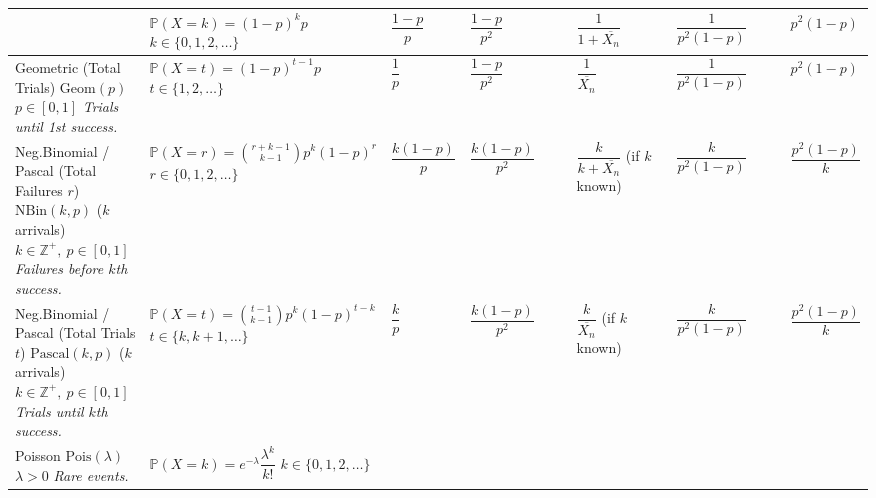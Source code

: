 \documentclass[8pt,a4paper]{extarticle}
\newcommand{\Pp}{\mathbb{P}}
\newcommand{\1}{\mathds{1}}
\begin{document}
\begin{table}[htpb]
{\begin{tabular}{@{}m{0.16\linewidth}m{0.26\linewidth}m{0.08\linewidth}m{0.14\linewidth}m{0.14\linewidth}m{0.15\linewidth}m{0.12\linewidth}@{}}
    & $\Pp(X=k)=(1-p)^k p$ \newline $k\in\{0,1,2,\dots\}$
    & $\dfrac{1-p}{p}$ & $\dfrac{1-p}{p^2}$
    & $\dfrac{1}{1+\overline{X_n}}$
    & $\dfrac{1}{p^2(1-p)}$
    & $p^2(1-p)$
    \\ \hline
    Geometric (Total Trials) \newline $\mathrm{Geom}(p)$ \newline $p \in [0,1]$ \newline \scriptsize\textit{Trials until 1st success.}
    & $\Pp(X=t)=(1-p)^{t-1} p$ \newline $t\in\{1,2,\dots\}$
    & $\dfrac{1}{p}$ & $\dfrac{1-p}{p^2}$
    & $\dfrac{1}{\overline{X_n}}$
    & $\dfrac{1}{p^2(1-p)}$
    & $p^2(1-p)$
    \\ \hline
    Neg.Binomial / Pascal \newline (Total Failures $r$) \newline $\mathrm{NBin}(k,p)$ ($k$ arrivals)\newline $k \in \mathbb{Z}^+,\ p \in [0,1]$ \newline \scriptsize\textit{Failures before $k$th success.}
    & $\Pp(X=r)=\binom{r+k-1}{k-1}p^k(1-p)^r$ \newline $r\in\{0,1,2,\dots\}$
    & $\dfrac{k(1-p)}{p}$ & $\dfrac{k(1-p)}{p^2}$
    & $\dfrac{k}{k+\overline{X_n}}$ \newline (if $k$ known)
    & $\dfrac{k}{p^2(1-p)}$
    & $\dfrac{p^2(1-p)}{k}$
    \\ \hline
    Neg.Binomial / Pascal \newline (Total Trials $t$) \newline $\mathrm{Pascal}(k,p)$ ($k$ arrivals)\newline $k \in \mathbb{Z}^+,\ p \in [0,1]$ \newline \scriptsize\textit{Trials until $k$th success.}
    & $\Pp(X=t) = \binom{t-1}{k-1} p^k (1-p)^{t-k}$ \newline $t\in\{k, k+1, \dots\}$
    & $\dfrac{k}{p}$ & $\dfrac{k(1-p)}{p^2}$
    & $\dfrac{k}{\overline{X_n}}$ \newline (if $k$ known)
    & $\dfrac{k}{p^2(1-p)}$
    & $\dfrac{p^2(1-p)}{k}$
    \\ \hline
    Poisson \newline $\mathrm{Pois}(\lambda)$ \newline $\lambda > 0$ \newline \scriptsize\textit{Rare events.}
    & $\Pp(X=k)=e^{-\lambda}\dfrac{\lambda^k}{k!}$ \newline $k\in\{0,1,2,\dots\}$

\end{tabular}}
\end{table}
\end{document}
